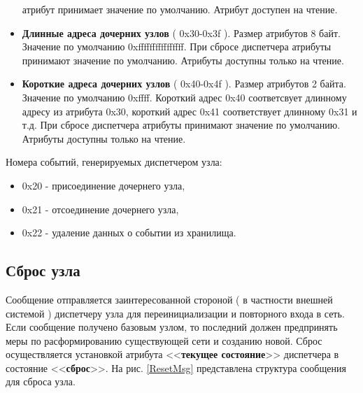 \begin{itemize}
атрибут принимает значение по умолчанию. Атрибут доступен на чтение.
\item {\bfseries Длинные адреса дочерних узлов} ( 0x30-0x3f ). Размер атрибутов 8 байт. Значение по умолчанию 0xffffffffffffffff.
При сбросе диспетчера атрибуты принимают значение по умолчанию. Атрибуты доступны только на чтение.
\item {\bfseries Короткие адреса дочерних узлов} ( 0x40-0x4f ). Размер атрибутов 2 байта. Значение по умолчанию 0xffff.
Короткий адрес 0x40 соответсвует длинному адресу из атрибута 0x30, короткий адрес 0x41 соответствует длинному 0x31
и т.д. При сбросе диспетчера атрибуты принимают значение по умолчанию. Атрибуты доступны только на чтение.
\end{itemize}

Номера событий, генерируемых диспетчером узла:
\begin{itemize}
\item 0x20 - присоединение дочернего узла,
\item 0x21 - отсоединение дочернего узла,
\item 0x22 - удаление данных о событии из хранилища.
\end{itemize}

\subsection{Сброс узла}
\label{ResetNode}

Сообщение отправляется заинтересованной стороной ( в частности внешней системой ) диспетчеру 
узла для переинициализации и повторного входа в сеть. Если сообщение получено базовым узлом,
то последний должен предпринять меры по расформированию существующей сети и созданию новой.
Сброс осуществляется установкой атрибута <<{\bfseries текущее состояние}>> диспетчера в состояние <<{\bfseries сброс}>>.
На рис. \ref{ResetMsg} представлена структура сообщения для сброса узла.

